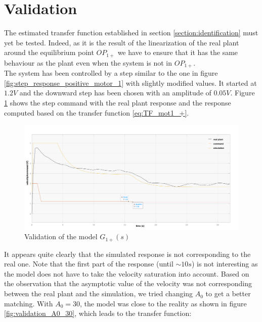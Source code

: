 \section{Validation}
\label{section_validation}

The estimated transfer function established in section \ref{section:identification} must yet be tested. Indeed, as it
is the result of the linearization of the real plant around the equilibrium point $OP_{1+}$ we have to ensure that it
has the same behaviour as the plant even when the system is not in $OP_{1+}$.\\

The system has been controlled by a step similar to the one in figure \ref{fig:step_response_positive_motor_1} with slightly
modified values. It started at $1.2 V$ and the downward step has been chosen with an amplitude of $0.05 V$. Figure 
\ref{fig:validation_A0_24} shows the step command with the real plant response and the response computed based on the
transfer function \ref{eq:TF_mot1_+}.

\begin{figure}[H]
    \centering
    \includegraphics[height=\textheight/3]{Pictures/validation_A0_24.png}
    \caption{Validation of the model $G_{1+} (s)$}
    \label{fig:validation_A0_24}
\end{figure}

It appears quite clearly that the simulated response is not corresponding to the real one. Note that the first part of
the response (until $\sim 10s$) is not interesting as the model does not have to take the velocity saturation into account.
Based on the observation that the asymptotic value of the velocity was not corresponding between the real plant and the
simulation, we tried changing $A_0$ to get a better matching. With $A_0 = 30$, the model was close to the reality as 
shown in figure \ref{fig:validation_A0_30}, which leads to the transfer function:

